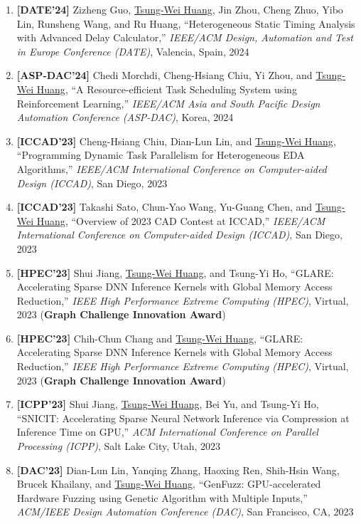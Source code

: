 \documentclass[A4,11pt]{article}
\begin{document}
\begin{enumerate}
    \item \textbf{[DATE'24]} Zizheng Guo, \underline{Tsung-Wei Huang}, Jin Zhou, Cheng Zhuo, Yibo Lin, Runsheng Wang, and Ru Huang, ``Heterogeneous Static Timing Analysis with Advanced Delay Calculator,'' \textit{IEEE/ACM Design, Automation and Test in Europe Conference (DATE)}, Valencia, Spain, 2024

    \item \textbf{[ASP-DAC'24]} Chedi Morchdi, Cheng-Hsiang Chiu, Yi Zhou, and \underline{Tsung-Wei Huang}, ``A Resource-efficient Task Scheduling System using Reinforcement Learning,'' \textit{IEEE/ACM Asia and South Pacific Design Automation Conference (ASP-DAC)}, Korea, 2024
    
    \item \textbf{[ICCAD'23]} Cheng-Hsiang Chiu, Dian-Lun Lin, and \underline{Tsung-Wei Huang}, ``Programming Dynamic Task Parallelism for Heterogeneous EDA Algorithms,'' \textit{IEEE/ACM International Conference on Computer-aided Design (ICCAD)}, San Diego, 2023
    
    \item \textbf{[ICCAD'23]} Takashi Sato, Chun-Yao Wang, Yu-Guang Chen, and \underline{Tsung-Wei Huang}, ``Overview of 2023 CAD Contest at ICCAD,'' \textit{IEEE/ACM International Conference on Computer-aided Design (ICCAD)}, San Diego, 2023
    
    \item \textbf{[HPEC'23]} Shui Jiang, \underline{Tsung-Wei Huang}, and Tsung-Yi Ho, ``GLARE: Accelerating Sparse DNN Inference Kernels with Global Memory Access Reduction,'' \textit{IEEE High Performance Extreme Computing (HPEC)}, Virtual, 2023 (\textbf{Graph Challenge Innovation Award})

    \item \textbf{[HPEC'23]} Chih-Chun Chang and \underline{Tsung-Wei Huang}, ``GLARE: Accelerating Sparse DNN Inference Kernels with Global Memory Access Reduction,'' \textit{IEEE High Performance Extreme Computing (HPEC)}, Virtual, 2023 (\textbf{Graph Challenge Innovation Award})

    \item \textbf{[ICPP'23]} Shui Jiang, \underline{Tsung-Wei Huang}, Bei Yu, and Tsung-Yi Ho, ``SNICIT: Accelerating Sparse Neural Network Inference via Compression at Inference Time on GPU,'' \textit{ACM International Conference on Parallel Processing (ICPP)}, Salt Lake City, Utah, 2023

    \item \textbf{[DAC'23]} Dian-Lun Lin, Yanqing Zhang, Haoxing Ren, Shih-Hsin Wang, Brucek Khailany, and \underline{Tsung-Wei Huang}, ``GenFuzz: GPU-accelerated Hardware Fuzzing using Genetic Algorithm with Multiple Inputs,'' \textit{ACM/IEEE Design Automation Conference (DAC)}, San Francisco, CA, 2023


\end{enumerate}
\end{document}
